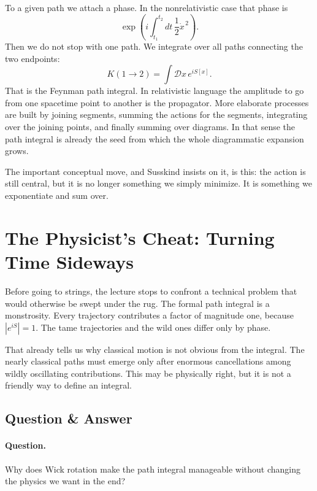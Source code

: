 To a given path we attach a phase. In the nonrelativistic case that phase is
\begin{equation}
\exp\!\left(i\int_{t_1}^{t_2} dt\,\frac12 \dot{x}^{\,2}\right).
\end{equation}
Then we do not stop with one path. We integrate over all paths connecting the two endpoints:
\begin{equation}
K(1\to 2)=\int \mathcal{D}x\,e^{iS[x]}.
\end{equation}
That is the Feynman path integral. In relativistic language the amplitude to go from one spacetime point to another is the propagator. More elaborate processes are built by joining segments, summing the actions for the segments, integrating over the joining points, and finally summing over diagrams. In that sense the path integral is already the seed from which the whole diagrammatic expansion grows.

The important conceptual move, and Susskind insists on it, is this: the action is still central, but it is no longer something we simply minimize. It is something we exponentiate and sum over.

\section{The Physicist's Cheat: Turning Time Sideways}

Before going to strings, the lecture stops to confront a technical problem that would otherwise be swept under the rug. The formal path integral is a monstrosity. Every trajectory contributes a factor of magnitude one, because \(|e^{iS}|=1\). The tame trajectories and the wild ones differ only by phase.

That already tells us why classical motion is not obvious from the integral. The nearly classical paths must emerge only after enormous cancellations among wildly oscillating contributions. This may be physically right, but it is not a friendly way to define an integral.

\subsection{Question \& Answer}

\paragraph{Question.} Why does Wick rotation make the path integral manageable without changing the physics we want in the end?

